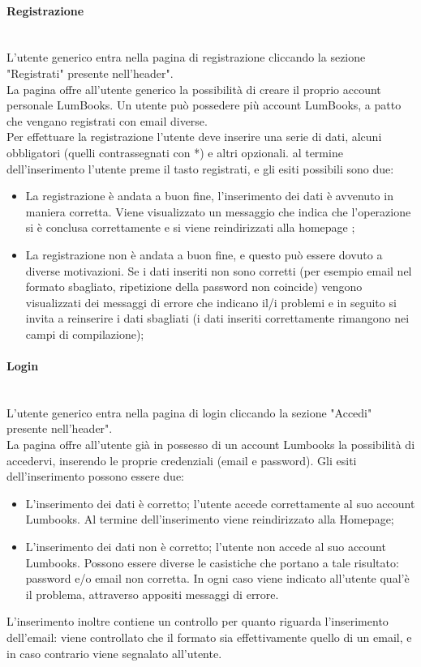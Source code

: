 \paragraph{Registrazione}\mbox{}\\
\label{par:Reg}
L'utente generico entra nella pagina di registrazione cliccando la sezione "Registrati" presente nell'header".\\
La pagina offre all'utente generico la possibilità di creare il proprio account personale LumBooks. Un utente può possedere più account LumBooks, a patto che vengano registrati con email diverse.\\
Per effettuare la registrazione l'utente deve inserire una serie di dati, alcuni obbligatori (quelli contrassegnati con *) e altri opzionali. al termine dell'inserimento l'utente preme il tasto registrati, e gli esiti possibili sono due:
\begin{itemize}
	\item La registrazione è andata a buon fine, l'inserimento dei dati è avvenuto in maniera corretta. Viene visualizzato un messaggio che indica che l'operazione si è conclusa correttamente e si viene reindirizzati alla homepage ;
	\item La registrazione non è andata a buon fine, e questo può essere dovuto a diverse motivazioni. Se i dati inseriti non sono corretti (per esempio email nel formato sbagliato, ripetizione della password non coincide) vengono visualizzati dei messaggi di errore che indicano il/i problemi e in seguito si invita a reinserire i dati sbagliati (i dati inseriti correttamente rimangono nei campi di compilazione);
\end{itemize}

\paragraph{Login}\mbox{}\\
\label{par:Login}
L'utente generico entra nella pagina di login cliccando la sezione "Accedi" presente nell'header".\\
La pagina offre all'utente già in possesso di un account Lumbooks la possibilità di accedervi, inserendo le proprie credenziali (email e password). Gli esiti dell'inserimento possono essere due:
\begin{itemize}
	\item L'inserimento dei dati è corretto; l'utente accede correttamente al suo account Lumbooks. Al termine dell'inserimento viene reindirizzato alla Homepage;
	\item L'inserimento dei dati non è corretto; l'utente non accede al suo account Lumbooks. Possono essere diverse le casistiche che portano a tale risultato: password e/o email non corretta. In ogni caso viene indicato all'utente qual'è il problema, attraverso appositi messaggi di errore. 
\end{itemize}
L'inserimento inoltre contiene un controllo per quanto riguarda l'inserimento dell'email: viene controllato che il formato sia effettivamente quello di un email, e in caso contrario viene segnalato all'utente.



